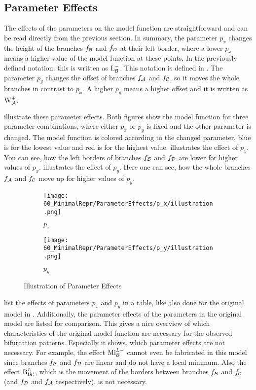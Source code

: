 \subsection{Parameter Effects}

The effects of the parameters on the model function are straightforward and can be read directly from the previous section.
In summary, the parameter $p_x$ changes the height of the branches $f_{\mathcal{B}}$ and $f_{\mathcal{D}}$ at their left border, where a lower $p_x$ means a higher value of the model function at these points.
In the previously defined notation, this is written as $\operatorname{L}_{\mathcal{B}}^-$.
This notation is defined in .
The parameter $p_y$ changes the offset of branches $f_{\mathcal{A}}$ and $f_{\mathcal{C}}$, so it moves the whole branches in contrast to $p_x$.
A higher $p_y$ means a higher offset and it is written as $\operatorname{W}_{\mathcal{A}}^+$.


 illustrate these parameter effects.
Both figures show the model function for three parameter combinations, where either $p_x$ or $p_y$ is fixed and the other parameter is changed.
The model function is colored according to the changed parameter, blue is for the lowest value and red is for the highest value.
 illustrates the effect of $p_x$.
You can see, how the left borders of branches $f_{\mathcal{B}}$ and $f_{\mathcal{D}}$ are lower for higher values of $p_x$.
 illustrates the effect of $p_y$.
Here one can see, how the whole branches $f_{\mathcal{A}}$ and $f_{\mathcal{C}}$ move up for higher values of $p_y$.

\begin{figure}
	\centering
	\begin{subfigure}{0.4\textwidth}
		\centering
		\texttt{[image: 60\_MinimalRepr/ParameterEffects/p\_x/illustration.png]}
		\caption{$p_x$}
		\label{fig:final.param.effects.px}
	\end{subfigure}
	\begin{subfigure}{0.4\textwidth}
		\centering
		\texttt{[image: 60\_MinimalRepr/ParameterEffects/p\_y/illustration.png]}
		\caption{$p_y$}
		\label{fig:final.param.effects.py}
	\end{subfigure}
	\caption{Illustration of Parameter Effects}
\end{figure}

 list the effects of parameters $p_x$ and $p_y$ in a table, like also done for the original model in .
Additionally, the parameter effects of the parameters in the original model are listed for comparison.
This gives a nice overview of which characteristics of the original model function are necessary for the observed bifurcation patterns.
Especially it shows, which parameter effects are not necessary.
For example, the effect $\operatorname{Mi}_{\mathcal{B}}^{L-}$ cannot even be fabricated in this model since branches $f_{\mathcal{B}}$ and $f_{\mathcal{D}}$ are linear and do not have a local minimum.
Also the effect $\operatorname{B}_{\mathcal{B}\mathcal{C}}^L$, which is the movement of the borders between branches $f_{\mathcal{B}}$ and $f_{\mathcal{C}}$ (and $f_{\mathcal{D}}$ and $f_{\mathcal{A}}$ respectively), is not necessary.

